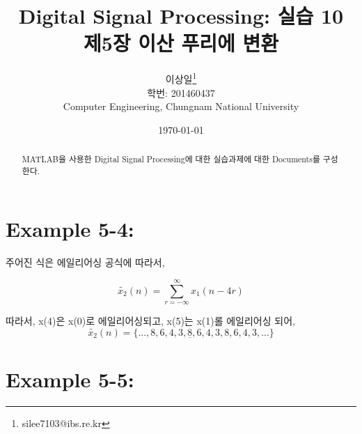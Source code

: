 \documentclass[11pt
  , a4paper
  , article
  , oneside
]{memoir}
\begin{document}
\newcommand{\technumber}{
  Digital Signal Processing using MATLAB\\
  Document 1: 2016-03-26}
\title{\textbf{Digital Signal Processing: 실습 10 \\
		제5장 이산 푸리에 변환 \\}}

\author{이상일\thanks{silee7103@ibs.re.kr} \\

  학번: 201460437\\
  Computer Engineering, Chungnam National University 
}
\date{\today}

\renewcommand{\maketitlehooka}{\begin{flushright}\textsf{\technumber}\end{flushright}}

\maketitle

\begin{abstract}
MATLAB을 사용한 Digital Signal Processing에 대한 실습과제에 대한 Documents를 구성한다.
\end{abstract}


\chapter{Example 5-4:}
주어진 식은 에일리어싱 공식에 따라서,

\begin {equation}
\tilde{x_2}(n) = \sum_{r=-\infty}^{\infty} x_1(n-4r) \nonumber
\end {equation}

따라서, x(4)은 x(0)로 에일리어싱되고, x(5)는 x(1)롤 에일리어싱 되어,
\begin {equation}
\tilde{x_2}(n) = {\{...,8,6,4,3,\underline{8},6,4,3,8,6,4,3,...\}} \nonumber
\end {equation}


\chapter{Example 5-5:}
\end{document}
